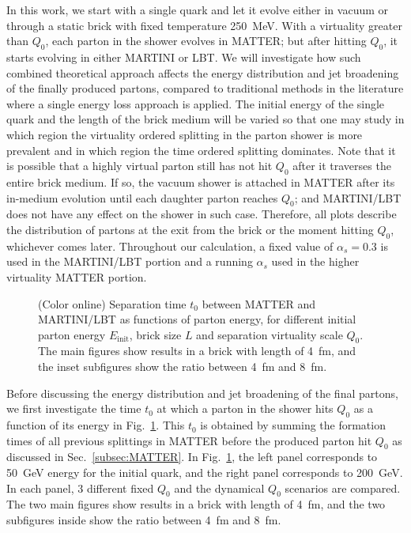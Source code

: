 \documentclass[aps,prc,twocolumn,floatfix,superscriptaddress,nofootinbib]{revtex4}
\begin{document}
 
In this work, we start with a single quark and let it evolve either in vacuum or through a static brick with fixed temperature 250~MeV. With a virtuality greater than $Q_0$, each parton in the shower evolves in MATTER; but after hitting $Q_0$, it starts evolving in either MARTINI or LBT. We will investigate how such combined theoretical approach affects the energy distribution and jet broadening of the finally produced partons, compared to traditional methods in the literature where a single energy loss approach is applied. The initial energy of the single quark and the length of the brick medium will be varied so that one may study in which region the virtuality ordered splitting in the parton shower is more prevalent and in which region the time ordered splitting dominates. Note that it is possible that a highly virtual parton still has not hit $Q_0$ after it traverses the entire brick medium. If so, the vacuum shower is attached in MATTER after its in-medium evolution until each daughter parton reaches $Q_0$; and MARTINI/LBT does not have any effect on the shower in such case. Therefore, all plots describe the distribution of partons at the exit from the brick or the moment hitting $Q_0$, whichever comes later. Throughout our calculation, a fixed value of $\alpha_s=0.3$ is used in the MARTINI/LBT portion and 
a running $\alpha_s$ used in the higher virtuality MATTER portion.

\begin{figure}[tb]
  \caption{(Color online) Separation time $t_0$ between MATTER and MARTINI/LBT as functions of parton energy, for different initial parton energy $E_\mathrm{init}$, brick size $L$ and separation virtuality scale $Q_0$. The main figures show results in a brick with length of 4~fm, and the inset subfigures show the ratio between 4~fm and 8~fm. 
}
 \label{fig:plot-t0vsE}
\end{figure}


Before discussing the energy distribution and jet broadening of the final partons, we first investigate the time $t_0$ at which a parton in the shower hits $Q_0$ as a function of its energy in Fig.~\ref{fig:plot-t0vsE}. This $t_0$ is obtained by summing the formation times of all previous splittings in MATTER before the produced parton hit $Q_0$ as discussed in Sec.~\ref{subsec:MATTER}. In Fig.~\ref{fig:plot-t0vsE}, the left panel corresponds to 50~GeV energy for the initial quark, and the right panel corresponds to 200~GeV. In each panel, 3 different fixed $Q_0$ and the dynamical $Q_0$ scenarios are compared. The two main figures show results in a brick with length of 4~fm, and the two subfigures inside show the ratio between 4~fm and 8~fm. 
\end{document}
